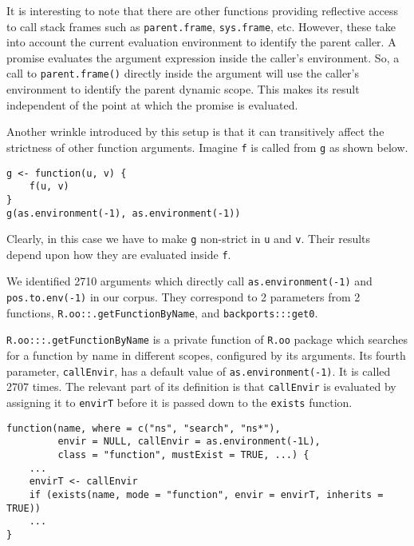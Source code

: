 \documentclass[review,nonacm,screen,acmsmall,anonymous=true]{acmart}
\newcommand{\code}[1]{\lstinline[style=R]|#1|\xspace}
\begin{document}
It is interesting to note that there are other functions providing reflective
access to call stack frames such as \code{parent.frame}, \code{sys.frame}, etc.
However, these take into account the current evaluation environment to identify
the parent caller. A promise evaluates the argument expression inside the
caller's environment. So, a call to \code{parent.frame()} directly inside the
argument will use the caller's environment to identify the parent dynamic scope.
This makes its result independent of the point at which the promise is
evaluated.

Another wrinkle introduced by this setup is that it can transitively affect the
strictness of other function arguments. Imagine \code{f} is called from \code{g}
as shown below.

\begin{lstlisting}
g <- function(u, v) {
    f(u, v)
}
g(as.environment(-1), as.environment(-1))
\end{lstlisting}

Clearly, in this case we have to make \code{g} non-strict in \code{u} and
\code{v}. Their results depend upon how they are evaluated inside \code{f}.

We identified 2710 arguments which directly call \code{as.environment(-1)} and
\code{pos.to.env(-1)} in our corpus. They correspond to 2 parameters from 2
functions, \code{R.oo::.getFunctionByName}, and \code{backports:::get0}.

\code{R.oo:::.getFunctionByName} is a private function of \code{R.oo} package
which searches for a function by name in different scopes, configured by its
arguments. Its fourth parameter, \code{callEnvir}, has a default value of
\code{as.environment(-1)}. It is called 2707 times. The relevant part of its
definition is that \code{callEnvir} is evaluated by assigning it to
\code{envirT} before it is passed down to the \code{exists} function.

\begin{lstlisting}
function(name, where = c("ns", "search", "ns*"),
         envir = NULL, callEnvir = as.environment(-1L),
         class = "function", mustExist = TRUE, ...) {
    ...
    envirT <- callEnvir
    if (exists(name, mode = "function", envir = envirT, inherits = TRUE))
    ...
}
\end{lstlisting}
\end{document}

